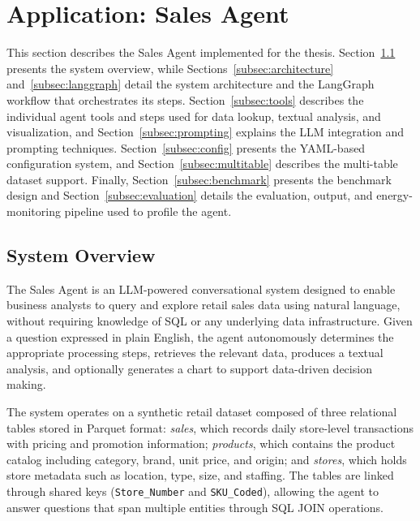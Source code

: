 \section{Application: Sales Agent}
\label{sec:application}

This section describes the Sales Agent implemented for the thesis.
Section~\ref{subsec:overview} presents the system overview, while
Sections~\ref{subsec:architecture} and~\ref{subsec:langgraph} detail the system
architecture and the LangGraph workflow that orchestrates its steps.
Section~\ref{subsec:tools} describes the individual agent tools and steps used
for data lookup, textual analysis, and visualization, and
Section~\ref{subsec:prompting} explains the LLM integration and prompting
techniques. Section~\ref{subsec:config} presents the YAML-based configuration
system, and Section~\ref{subsec:multitable} describes the multi-table dataset
support. Finally, Section~\ref{subsec:benchmark} presents the benchmark design
and Section~\ref{subsec:evaluation} details the evaluation, output, and
energy-monitoring pipeline used to profile the agent.

\subsection{System Overview}
\label{subsec:overview}

The Sales Agent is an LLM-powered conversational system designed to enable business analysts
to query and explore retail sales data using natural language, without requiring knowledge of SQL
or any underlying data infrastructure. Given a question expressed in plain English, the agent
autonomously determines the appropriate processing steps, retrieves the relevant data, produces
a textual analysis, and optionally generates a chart to support data-driven decision making.

The system operates on a synthetic retail dataset composed of three relational tables stored in
Parquet format: \textit{sales}, which records daily store-level transactions with pricing and
promotion information; \textit{products}, which contains the product catalog including category,
brand, unit price, and origin; and \textit{stores}, which holds store metadata such as location,
type, size, and staffing. The tables are linked through shared keys (\texttt{Store\_Number} and
\texttt{SKU\_Coded}), allowing the agent to answer questions that span multiple entities through
SQL JOIN operations.

